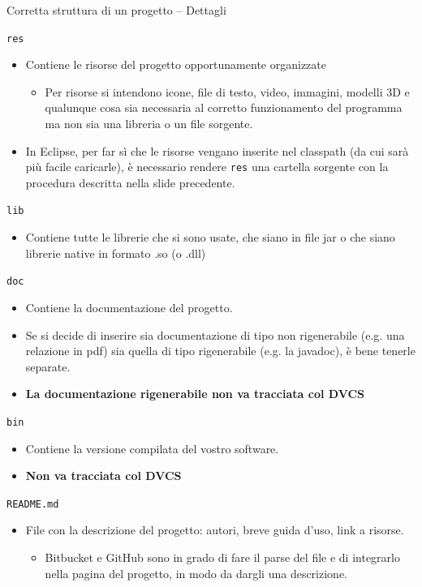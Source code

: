 \documentclass[presentation]{beamer}
\begin{document}
\begin{frame}[allowframebreaks]{Corretta struttura di un progetto -- Dettagli}
	\begin{block}{\texttt{res}}
		\begin{itemize}
			\item Contiene le risorse del progetto opportunamente organizzate
			\begin{itemize}
				\item Per risorse si intendono icone, file di testo, video, immagini, modelli 3D e qualunque cosa sia necessaria al corretto funzionamento del programma ma non sia una libreria o un file sorgente.
			\end{itemize}
			\item In Eclipse, per far sì che le risorse vengano inserite nel classpath (da cui sarà più facile caricarle), è necessario rendere \texttt{res} una cartella sorgente con la procedura descritta nella slide precedente.
		\end{itemize}
	\end{block}
	\begin{block}{\texttt{lib}}
		\begin{itemize}
			\item	Contiene tutte le librerie che si sono usate, che siano in file jar o che siano librerie native in formato .so (o .dll)
		\end{itemize}
	\end{block}
	\begin{block}{\texttt{doc}}
		\begin{itemize}
			\item Contiene la documentazione del progetto.
			\item Se si decide di inserire sia documentazione di tipo non rigenerabile (e.g. una relazione in pdf) sia quella di tipo rigenerabile (e.g. la javadoc), è bene tenerle separate.
			\item \textbf{La documentazione rigenerabile non va tracciata col DVCS}
		\end{itemize}
	\end{block}
	\begin{block}{\texttt{bin}}
		\begin{itemize}
			\item Contiene la versione compilata del vostro software.
			\item \textbf{Non va tracciata col DVCS}
		\end{itemize}
	\end{block}
	\begin{block}{\texttt{README.md}}
		\begin{itemize}
			\item File con la descrizione del progetto: autori, breve guida d'uso, link a risorse.
			\begin{itemize}
				\item Bitbucket e GitHub sono in grado di fare il parse del file e di integrarlo nella pagina del progetto, in modo da dargli una descrizione.
			\end{itemize} 
		\end{itemize} 
	\end{block}
\end{frame}
\end{document}
